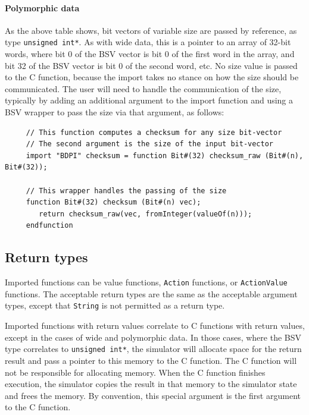 \documentclass[twoside,letterpaper]{article}
\newcommand{\te}[1]{\texttt{#1}}
\begin{document}
\paragraph{Polymorphic data} As the above table shows, bit vectors of variable
size are  passed by reference, as type \te{unsigned int*}. As with wide
data,  this is a pointer to an array of 32-bit words, where bit 0 of
the BSV  vector is bit 0 of the first word in the array, and bit 32 of
the BSV  vector is bit 0 of the second word, etc. No size value is
passed to  the C function, because the import takes no stance on how
the size  should be communicated. The user will need to handle the
communication of the size, typically by adding an additional argument
to the import  function and using a BSV wrapper to pass the size via
that  argument, as follows:

\begin{verbatim}
     // This function computes a checksum for any size bit-vector
     // The second argument is the size of the input bit-vector
     import "BDPI" checksum = function Bit#(32) checksum_raw (Bit#(n), Bit#(32));

     // This wrapper handles the passing of the size
     function Bit#(32) checksum (Bit#(n) vec);
        return checksum_raw(vec, fromInteger(valueOf(n)));
     endfunction
\end{verbatim}


\subsection{Return types}

Imported functions can be value functions, \te{Action} functions, or
\te{ActionValue}  functions. The acceptable return types are the same as
the  acceptable argument types, except that \te{String} is not permitted as
a  return type.

Imported functions with return values correlate to C functions with
return  values, except in the cases of wide and polymorphic data. In
those  cases, where the BSV type correlates to \te{unsigned int*}, 
the simulator  will allocate space for the return result and pass a
pointer to  this memory to the C function. The C function will not be
responsible for allocating memory. When the C function finishes
execution,  the simulator copies the result in that memory to the
simulator  state and frees the memory.
By convention, this special argument is the first argument 
 to the C function.
\end{document}
